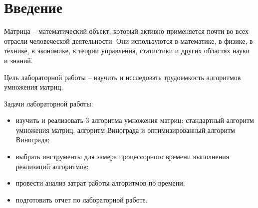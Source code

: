\chapter*{Введение}

Матрица -- математический объект, который активно применяется почти во всех отрасли человеческой деятельности. Они используются в математике, в физике, в технике, в экономике, в теории управления, статистики и других областях науки и знаний.

Цель лабораторной работы -- изучить и исследовать трудоемкость алгоритмов умножения матриц.

Задачи лабораторной работы:
\begin{itemize}
	\item изучить и реализовать 3 алгоритма умножения матриц: стандартный алгоритм умножения матриц, алгоритм Винограда и оптимизированный алгоритм Винограда;
	\item выбрать инструменты для замера процессорного времени выполнения реализаций алгоритмов;
	\item провести анализ затрат работы алгоритмов по времени;
	\item подготовить отчет по лабораторной работе.
\end{itemize}

